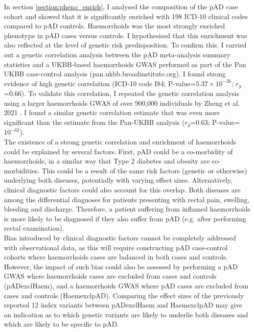   In section \ref{section:pheno_enrich}, I analysed the composition of the pAD case cohort and showed that it is significantly enriched with 198 ICD-10 clinical codes compared to pAD controls. Haemorrhoids was the most strongly enriched phenotype in pAD cases versus controls. I hypothesised that this enrichment was also reflected at the level of genetic risk predisposition. To confirm this, I carried out a genetic correlation analysis between the pAD meta-analysis summary statistics and a UKBB-based haemorrhoids GWAS performed as part of the Pan UKBB case-control analysis (pan.ukbb.broadinstitute.org). I found strong evidence of high genetic correlation (ICD-10 code I84; P-value=$5.37\times10^{-26}$; $r_{g}$=0.66). To validate this correlation, I repeated the genetic correlation analysis using a larger haemorrhoids GWAS of over 900,000 individuals by Zheng et al. 2021 \cite{Zheng2021-ss}. I found a similar genetic correlation estimate that was even more significant than the estimate from the Pan-UKBB analysis ($r_{g}$=0.63; P-value=$10^{-62}$).\\
  

  The existence of a strong genetic correlation and enrichment of haemorrhoids could be explained by several factors. First, pAD could be a co-morbidity of haemorrhoids, in a similar way that Type 2 diabetes and obesity are co-morbidities. This could be a result of the same risk factors (genetic or otherwise) underlying both diseases, potentially with varying effect sizes. Alternatively, clinical diagnostic factors could also account for this overlap. Both diseases are among the differential diagnoses for patients presenting with rectal pain, swelling, bleeding and discharge. Therefore, a patient suffering from inflamed haemorrhoids is more likely to be diagnosed if they also suffer from pAD (e.g. after performing rectal examination). \\ 

Bias introduced by clinical diagnostic factors cannot be completely addressed with observational data, as this will require constructing pAD case-control cohorts where haemorrhoids cases are  balanced in both cases and controls. However, the impact of such bias could also be assessed by performing a pAD GWAS where haemorrhoids cases are excluded from cases and controls (pADexclHaem), and a haemorrhoids GWAS where pAD cases are excluded from cases and controls (HaemexclpAD). Comparing the effect sizes of the previously reported 12 index variants between pADexclHaem and HaemexclpAD may give an indication as to which genetic variants are likely to underlie both diseases and which are likely to be specific to pAD. \\

